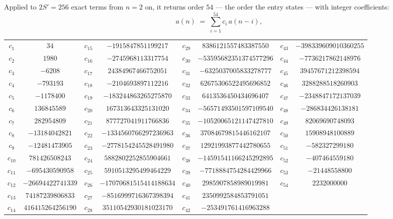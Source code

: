 \documentclass[11pt,a4paper]{article}
\theoremstyle{plain}
\theoremstyle{definition}
\begin{document}
Applied to $2S'=256$ exact terms from $n=2$ on, it returns order $54$ --- the
order the entry states --- with integer coefficients:
\[
a(n)\;=\;\sum_{i=1}^{54}c_i\,a(n-i),
\]
\begin{center}\small
\begin{tabular}{cccccccc}
$c_{1}$ & $34$ & $c_{15}$ & $-1915847851199217$ & $c_{29}$ & $8386121557483387550$ & $c_{43}$ & $-398339609010360255$ \\
$c_{2}$ & $1980$ & $c_{16}$ & $-2745968113317754$ & $c_{30}$ & $-53595682351374577296$ & $c_{44}$ & $-7736217862148976$ \\
$c_{3}$ & $-6208$ & $c_{17}$ & $24384967466752051$ & $c_{31}$ & $-6325037005833278777$ & $c_{45}$ & $39457671212398594$ \\
$c_{4}$ & $-793193$ & $c_{18}$ & $-2104693897112216$ & $c_{32}$ & $62675306522495696852$ & $c_{46}$ & $3288288518260903$ \\
$c_{5}$ & $-1178400$ & $c_{19}$ & $-183244863265275870$ & $c_{33}$ & $6413536450434696407$ & $c_{47}$ & $-2348847172137039$ \\
$c_{6}$ & $136845589$ & $c_{20}$ & $167313643325131020$ & $c_{34}$ & $-56571493501597109540$ & $c_{48}$ & $-286834426138181$ \\
$c_{7}$ & $282954809$ & $c_{21}$ & $877727041911766836$ & $c_{35}$ & $-10520065121147427810$ & $c_{49}$ & $82069690748093$ \\
$c_{8}$ & $-13184042821$ & $c_{22}$ & $-1334560766297236963$ & $c_{36}$ & $37084679815446162107$ & $c_{50}$ & $15908948100889$ \\
$c_{9}$ & $-12481473905$ & $c_{23}$ & $-2778154245528491980$ & $c_{37}$ & $12921993877442780655$ & $c_{51}$ & $-582327299180$ \\
$c_{10}$ & $781426508243$ & $c_{24}$ & $5882802252855904661$ & $c_{38}$ & $-14591541166245292895$ & $c_{52}$ & $-407464559180$ \\
$c_{11}$ & $-695430590958$ & $c_{25}$ & $5910513295499464229$ & $c_{39}$ & $-7718884754284429966$ & $c_{53}$ & $-21448558800$ \\
$c_{12}$ & $-26694422741339$ & $c_{26}$ & $-17070681515414188634$ & $c_{40}$ & $2985907858989019981$ & $c_{54}$ & $2232000000$ \\
$c_{13}$ & $74187239806833$ & $c_{27}$ & $-8516999716367398394$ & $c_{41}$ & $2350992584853791051$ &  &  \\
$c_{14}$ & $416415264256190$ & $c_{28}$ & $35110542930181023170$ & $c_{42}$ & $-253491761416963288$ &  &  \\
\end{tabular}
\end{center}
\end{document}
